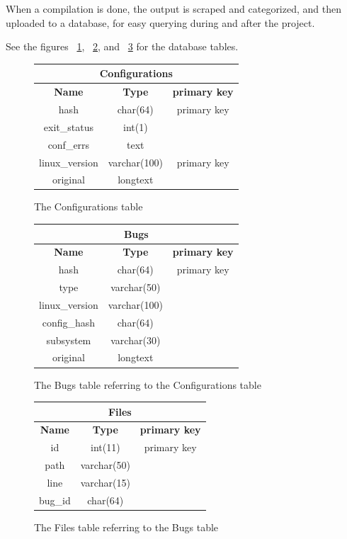 \documentclass[a4paper,11pt]{article}
\newcommand{\figa}{
    \begin{figure}[!htpb]
    \centering
}
\newcommand{\figb}[2]{
    \caption{#1}
    \label{#2}
    \end{figure}
}
\begin{document}
When a compilation is done, the output is scraped and categorized, and then 
uploaded to a database, for easy querying during and after the project. 

See the figures ~\ref{fig:conftable}, ~\ref{fig:bugstable}, and 
~\ref{fig:filestable} for the database tables.


\figa
    \begin{tabular}{c|c|c}
        \hline 
        \hline
        \multicolumn{3}{c}{\textbf{Configurations}} \\
        \hline
        \textbf{Name} & \textbf{Type} &\textbf{primary key} \\
        \hline
        hash & char(64) & primary key \\
        exit\_status & int(1) \\
        conf\_errs & text \\
        linux\_version & varchar(100) & primary key \\
        original & longtext \\
        \hline
        \hline
    \end{tabular}
\figb{The Configurations table}{fig:conftable}

\figa
    \begin{tabular}{c|c|c}
        \hline
        \hline
        \multicolumn{3}{c}{\textbf{Bugs}} \\
        \hline
        \textbf{Name} & \textbf{Type} &\textbf{primary key} \\
        \hline
        hash & char(64) & primary key \\
        type & varchar(50) \\
        linux\_version & varchar(100) \\
        config\_hash & char(64) \\
        subsystem & varchar(30) \\
        original & longtext \\
        \hline
        \hline
    \end{tabular}
\figb{The Bugs table referring to the Configurations table}{fig:bugstable}

\figa
    \begin{tabular}{c|c|c}
        \hline
        \hline
        \multicolumn{3}{c}{\textbf{Files}} \\
        \hline
        \textbf{Name} & \textbf{Type} &\textbf{primary key} \\
        \hline
        id & int(11) & primary key \\
        path & varchar(50) \\
        line & varchar(15) \\
        bug\_id & char(64) \\
        \hline
        \hline
    \end{tabular}
\figb{The Files table referring to the Bugs table}{fig:filestable}
\end{document}

